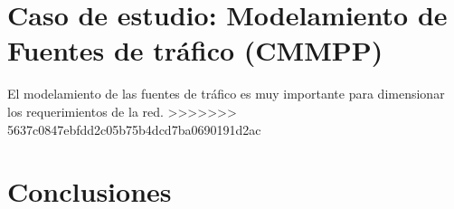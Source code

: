 \documentclass[journal]{IEEEtran}
\begin{document}
\section{Caso de estudio: Modelamiento de Fuentes de tráfico (CMMPP)}
El modelamiento de las fuentes de tráfico es muy importante para dimensionar los requerimientos de la red. 
>>>>>>> 5637c0847ebfdd2c05b75b4dcd7ba0690191d2ac
\section{Conclusiones}




%
\end{document}
